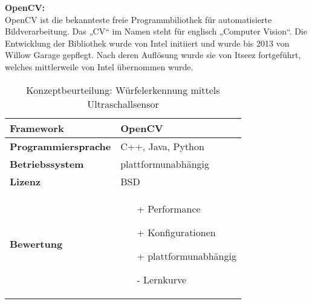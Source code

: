 \documentclass[../../main.tex]{subfiles}
\begin{document}
        \textbf{OpenCV: }\\
        OpenCV ist die bekannteste freie Programmbiliothek für automatisierte Bildverarbeitung. Das „CV“ im Namen steht für englisch „Computer Vision“. Die Entwicklung der Bibliothek wurde von Intel initiiert und wurde bis 2013 von Willow Garage gepflegt. Nach deren Auflösung wurde sie von Itseez fortgeführt, welches mittlerweile von Intel übernommen wurde.
        \begin{flushleft}
            \begin{table}[h]
            \begin{tabular}{ | l | p{11cm} |}
            \hline
            \textbf{Framework} & OpenCV \\ \hline
            \textbf{Programmiersprache} & C++, Java, Python \\ \hline
            \textbf{Betriebssystem} & plattformunabhängig \\ \hline
            \textbf{Lizenz} & BSD \\ \hline
            \textbf{Bewertung} &  \begin{itemize}
                                    \item[+] Performance
                                    \item[+] Konfigurationen
                                    \item[+] plattformunabhängig 
                                    \item[-] Lernkurve
                                  \end{itemize} \\ \hline
            \end{tabular}
            \caption{Konzeptbeurteilung: Würfelerkennung mittels Ultraschallsensor}
            \label{tab:konzept_wurfel_ultraschall}
            \end{table}
        \end{flushleft}
        \vspace{0.5cm}
\end{document}
